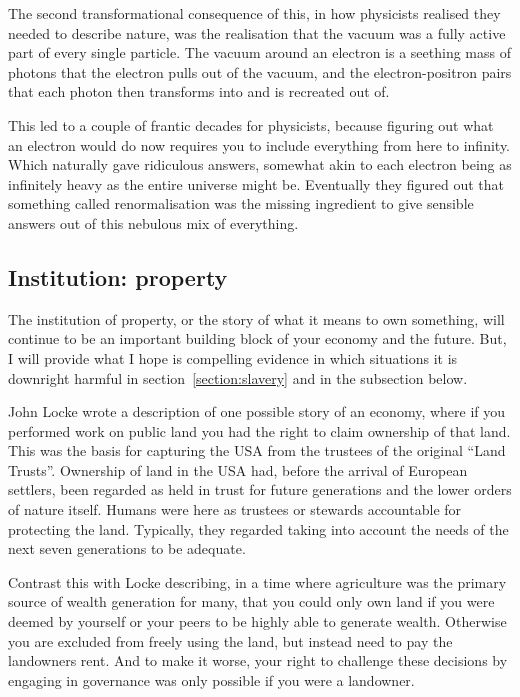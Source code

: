 The second transformational consequence of this, in how physicists realised they needed to describe nature, was the realisation that the vacuum was a fully active part of every single particle. The vacuum around an electron is a seething mass of photons that the electron pulls out of the vacuum, and the electron-positron pairs that each photon then transforms into and is recreated out of. 


This led to a couple of frantic decades for physicists, because figuring out what an electron would do now requires you to include everything from here to infinity. Which naturally gave ridiculous answers, somewhat akin to each electron being as infinitely heavy as the entire universe might be. Eventually they figured out that something called renormalisation was the missing ingredient to give sensible answers out of this nebulous mix of everything.




\subsection{Institution: property}
The institution of property, or the story of what it means to own something, will continue to be an important building block of your economy and the future. But, I will provide what I hope is compelling evidence in which situations it is downright harmful in section~\ref{section:slavery} and in the subsection below.


John Locke wrote a description of one possible story of an economy, where if you performed work on public land you had the right to claim ownership of that land. This was the basis for capturing the USA from the trustees of the original “Land Trusts”. Ownership of land in the USA had, before the arrival of European settlers, been regarded as held in trust for future generations and the lower orders of nature itself. Humans were here as trustees or stewards accountable for protecting the land. Typically, they regarded taking into account the needs of the next seven generations to be adequate. 


Contrast this with Locke\cite{locke-two-treatises} describing, in a time where agriculture was the primary source of wealth generation for many, that you could only own land if you were deemed by yourself or your peers to be highly able to generate wealth. Otherwise you are excluded from freely using the land, but instead need to pay the landowners rent. And to make it worse, your right to challenge these decisions by engaging in governance was only possible if you were a landowner.


